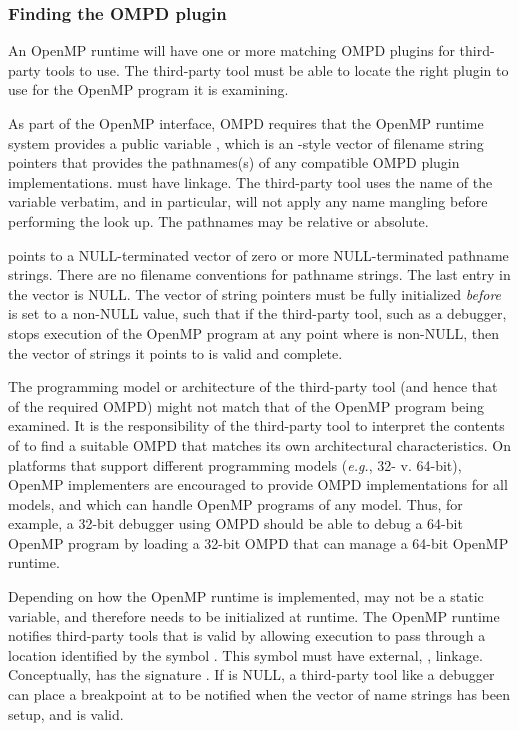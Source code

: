 \subsubsection{Finding the OMPD plugin}
\label{sec:ompd:finding-the-ompd}

An OpenMP runtime will have one or more matching OMPD plugins for third-party
tools to use.
The third-party tool must be able to locate the right plugin to use
for the OpenMP program it is examining.

As part of the OpenMP interface, OMPD requires that the OpenMP
runtime system provides a public variable ,
which is an -style vector of filename string pointers that
provides the pathnames(s) of any compatible OMPD plugin implementations.
 must have  linkage.
The third-party tool uses the name of the variable verbatim,
and in particular, will not apply any name mangling before
performing the look up.
The pathnames may be relative or absolute.

 points to a NULL-terminated
vector of zero or more NULL-terminated pathname strings.
There are no filename conventions for pathname strings.
The last entry in the vector is NULL.
The vector of string pointers must be fully initialized \emph{before}
 is set to a non-NULL value,
such that if the third-party tool, such as a debugger,
stops execution of the OpenMP program at any point where
 is non-NULL,
then the vector of strings it points to is valid and complete.

The programming model or architecture of the third-party tool (and hence
that of the required OMPD) might not match that of the OpenMP program
being examined.
It is the responsibility of the third-party tool to interpret the contents
of  to find a suitable OMPD that matches
its own architectural characteristics.
On platforms that support different programming models
(\textit{e.g.}, 32- v. 64-bit), OpenMP implementers are encouraged
to provide OMPD implementations for all models, and which can handle
OpenMP programs of any model.
Thus, for example, a 32-bit debugger using OMPD should be able
to debug a 64-bit OpenMP program
by loading a 32-bit OMPD that can manage a 64-bit OpenMP runtime.

Depending on how the OpenMP runtime is implemented, 
may not be a static variable, and therefore needs to be initialized
at runtime.
The OpenMP runtime notifies third-party tools that 
is valid by allowing execution to pass through a location identified
by the symbol .
This symbol must have external, , linkage.
Conceptually,  has the signature
.
If  is NULL, a third-party tool like a debugger
can place a breakpoint at  to be notified
when the vector of name strings has been setup, and is valid.

